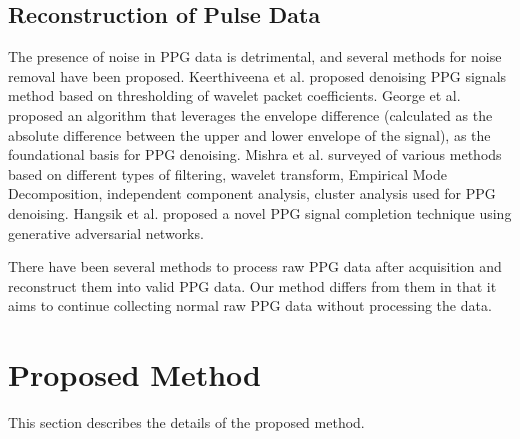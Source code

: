 \documentclass[sigconf]{acmart}
\begin{document}
\subsection{Reconstruction of Pulse Data}
The presence of noise in PPG data is detrimental, and several methods for noise removal have been proposed.
Keerthiveena et al.\cite{pulse_data_denoise_keerthiveena} proposed denoising PPG signals method based on thresholding of wavelet packet coefficients.
George et al.\cite{pulse_data_denoise_george} proposed an algorithm that leverages the envelope difference (calculated as the absolute difference between the upper and lower envelope of the signal), as the foundational basis for PPG denoising.
Mishra et al.\cite{pulse_data_denoise_mishra} surveyed of various methods based on different types of filtering, wavelet transform, Empirical Mode Decomposition, independent component analysis, cluster analysis used for PPG denoising.
Hangsik et al.\cite{pulse_data_completion_hangsik} proposed a novel PPG signal completion technique using generative adversarial networks.\par

There have been several methods to process raw PPG data after acquisition and reconstruct them into valid PPG data. Our method differs from them in that it aims to continue collecting normal raw PPG data without processing the data.



\section{Proposed Method}
\label{sec:method}
This section describes the details of the proposed method.
\end{document}
